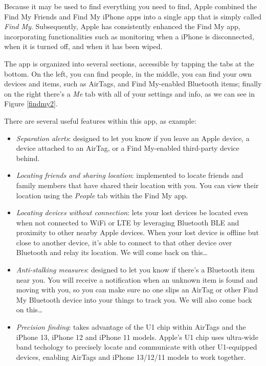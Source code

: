 \documentclass[english]{article}
\begin{document}
Because it may be used to find everything you need to find, Apple combined the Find My Friends and Find My iPhone apps into a single app that is simply called \textit{Find My}. Subsequently, Apple has consistently enhanced the Find My app, incorporating functionalities such as monitoring when a iPhone is disconnected, when it is turned off, and when it has been wiped.

The app is organized into several sections, accessible by tapping the tabs at the bottom. On the left, you can find people, in the middle, you can find your own devices and items, such as AirTags, and Find My-enabled Bluetooth items; finally on the right there's a \textit{Me} tab with all of your settings and info, as we can see in Figure \ref{findmy2}.

There are several useful features within this app, as example:
\begin{itemize}
  \item \textit{Separation alerts}: designed to let you know if you leave an Apple device, a device attached to an AirTag, or a Find My-enabled third-party device behind.
  \item \textit{Locating friends and sharing location}: implemented to locate friends and family members that have shared their location with you. You can view their location using the \textit{People} tab within the Find My app.
  \item \textit{Locating devices without connection}: lets your lost devices be located even when not connected to WiFi or LTE by leveraging Bluetooth BLE and proximity to other nearby Apple devices. When your lost device is offline but close to another device, it's able to connect to that other device over Bluetooth and relay its location. We will come back on this\ldots
  \item \textit{Anti-stalking measures}: designed to let you know if there's a Bluetooth item near you. You will receive a notification when an unknown item is found and moving with you, so you can make sure no one slips an AirTag or other Find My Bluetooth device into your things to track you. We will also come back on this\ldots
  \item \textit{Precision finding}: takes advantage of the U1 chip within AirTags and the iPhone 13, iPhone 12 and iPhone 11 models. Apple's U1 chip uses ultra-wide band techology to precisely locate and communicate with other U1-equipped devices, enabling AirTags and iPhone 13/12/11 models to work together.
\end{itemize}
\end{document}

